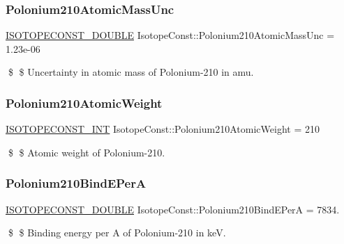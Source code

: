 \subsubsection{\texorpdfstring{Polonium210\+Atomic\+Mass\+Unc}{Polonium210AtomicMassUnc}}
{\footnotesize\ttfamily \mbox{\hyperlink{group___isotope_const-_macros_ga8f45a7272ce02c0b4c65c44636ed719a}{I\+S\+O\+T\+O\+P\+E\+C\+O\+N\+S\+T\+\_\+\+D\+O\+U\+B\+LE}} Isotope\+Const\+::\+Polonium210\+Atomic\+Mass\+Unc = 1.\+23e-\/06}

\$ \$ Uncertainty in atomic mass of Polonium-\/210 in amu. \mbox{\label{group___isotope_const-_polonium-_po210_gad80f7f625d689f5053f4b3d36ccf9230}} 
\subsubsection{\texorpdfstring{Polonium210\+Atomic\+Weight}{Polonium210AtomicWeight}}
{\footnotesize\ttfamily \mbox{\hyperlink{group___isotope_const-_macros_ga5f18360b3e99483a35c32d789e62621c}{I\+S\+O\+T\+O\+P\+E\+C\+O\+N\+S\+T\+\_\+\+I\+NT}} Isotope\+Const\+::\+Polonium210\+Atomic\+Weight = 210}

\$ \$ Atomic weight of Polonium-\/210. \mbox{\label{group___isotope_const-_polonium-_po210_gaed8862c258174c891b0de2a52117d678}} 
\subsubsection{\texorpdfstring{Polonium210\+Bind\+E\+PerA}{Polonium210BindEPerA}}
{\footnotesize\ttfamily \mbox{\hyperlink{group___isotope_const-_macros_ga8f45a7272ce02c0b4c65c44636ed719a}{I\+S\+O\+T\+O\+P\+E\+C\+O\+N\+S\+T\+\_\+\+D\+O\+U\+B\+LE}} Isotope\+Const\+::\+Polonium210\+Bind\+E\+PerA = 7834.}

\$ \$ Binding energy per A of Polonium-\/210 in keV. \mbox{\label{group___isotope_const-_polonium-_po210_gabf1c5d3cb0a88a01b0fbdc24c28ee769}} 
